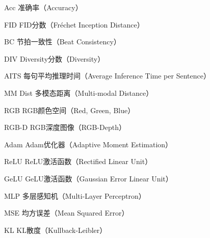 \begin{denotation}[3cm]
  
  \item[Acc] 准确率（Accuracy）
  \item[FID] FID分数（Fréchet Inception Distance）
  \item[BC] 节拍一致性（Beat Consistency）
  \item[DIV] Diversity分数（Diversity）
  \item[AITS] 每句平均推理时间（Average Inference Time per Sentence）
  \item[MM Dist] 多模态距离（Multi-modal Distance）
  
  \item[RGB] RGB颜色空间（Red, Green, Blue）
  \item[RGB-D] RGB深度图像（RGB-Depth）
  \item[Adam] Adam优化器（Adaptive Moment Estimation）
  \item[ReLU] ReLU激活函数（Rectified Linear Unit）
  \item[GeLU] GeLU激活函数（Gaussian Error Linear Unit）
  \item[MLP] 多层感知机（Multi-Layer Perceptron）
  \item[MSE] 均方误差（Mean Squared Error）
  \item[KL] KL散度（Kullback-Leibler）
\end{denotation}





